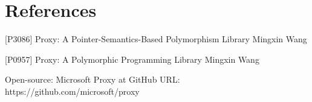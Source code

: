 \documentclass[10pt, a4paper, oneside]{article}
\begin{document}
\section{References}
\begin{thebibliography}{9}
[P3086] Proxy: A Pointer-Semantics-Based Polymorphism Library\smallbreak
Mingxin Wang

[P0957] Proxy: A Polymorphic Programming Library\smallbreak
Mingxin Wang

Open-source: Microsoft Proxy at GitHub\smallbreak
URL: https://github.com/microsoft/proxy
\end{thebibliography}
\end{document}
